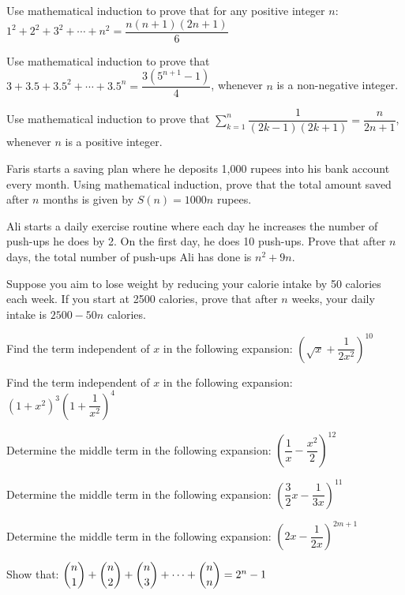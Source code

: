 \documentclass[11pt,a4paper]{article}
\begin{document}
\begin{longlist}
\item Use mathematical induction to prove that for any positive integer $n$: $1^2+2^2+3^2+\cdots+n^2=\dfrac{n(n+1)(2n+1)}{6}$

\item Use mathematical induction to prove that $3+3.5+3.5^2+\cdots+3.5^n=\dfrac{3(5^{n+1}-1)}{4}$, whenever $n$ is a non-negative integer.

\item Use mathematical induction to prove that $\displaystyle\sum_{k=1}^{n}\dfrac{1}{(2k-1)(2k+1)}=\dfrac{n}{2n+1}$, whenever $n$ is a positive integer.

\item Faris starts a saving plan where he deposits 1,000 rupees into his bank account every month. Using mathematical induction, prove that the total amount saved after $n$ months is given by $S(n)=1000n$ rupees.

\item Ali starts a daily exercise routine where each day he increases the number of push-ups he does by 2. On the first day, he does 10 push-ups. Prove that after $n$ days, the total number of push-ups Ali has done is $n^2+9n$.

\item Suppose you aim to lose weight by reducing your calorie intake by 50 calories each week. If you start at 2500 calories, prove that after $n$ weeks, your daily intake is $2500-50n$ calories.

\item Find the term independent of $x$ in the following expansion: $\left(\sqrt{x}+\dfrac{1}{2x^2}\right)^{10}$

\item Find the term independent of $x$ in the following expansion: $(1+x^2)^3\left(1+\dfrac{1}{x^2}\right)^4$

\item Determine the middle term in the following expansion: $\left(\dfrac{1}{x}-\dfrac{x^2}{2}\right)^{12}$

\item Determine the middle term in the following expansion: $\left(\dfrac{3}{2}x-\dfrac{1}{3x}\right)^{11}$

\item Determine the middle term in the following expansion: $\left(2x-\dfrac{1}{2x}\right)^{2m+1}$

\item Show that: $\dbinom{n}{1}+\dbinom{n}{2}+\dbinom{n}{3}+\cdots+\dbinom{n}{n}=2^n-1$


\end{longlist}
\end{document}
